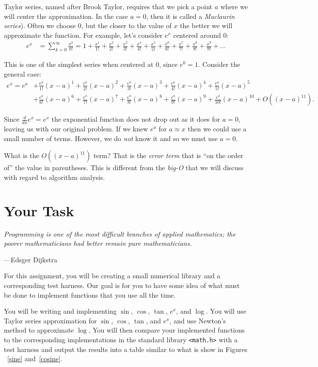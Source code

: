 \documentclass[11pt]{article}
\newcommand{\mlterm}[1]{\frac{x^{#1}}{#1!}}
\newcommand{\eterm}[1]{\frac{e^a}{#1!}{(x-a)}^{#1}}
\begin{document}
Taylor series, named after Brook Taylor, requires that we pick a point $a$ where
we will center the approximation. In the case $a =0$, then it is called a
\emph{Maclaurin series}).  Often we choose $0$, but the closer to the value of
$x$ the better we will approximate the function. For example, let's consider
$e^x$ centered around $0$:
\begin{align*}
  e^x & = \sum_{k=0}^{\infty} \frac{x^k}{k!} = 1 + \mlterm{1} + \mlterm{2} +
  \mlterm{3} + \mlterm{4} + \mlterm{5} + \mlterm{6} + \mlterm{7} + \mlterm{8} +
  \mlterm{9} + \ldots
\end{align*}

This is one of the simplest series when centered at $0$, since $e^0 = 1$.
Consider the general case:
\begin{align*}
  e^x = e^a &+ \eterm{1} + \eterm{2} + \eterm{3} + \eterm{4} + \eterm{5} \\
            &+ \eterm{6} + \eterm{7} + \eterm{8} + \eterm{9} + \eterm{10}
             + O({(x-a)}^{11}).
\end{align*}

Since $\frac{d}{dx}e^x=e^x$ the exponential function does not drop out as it
does for $a=0$, leaving us with our original problem. If we knew $e^a$ for $a
\approx x$ then we could use a small number of terms. However, we do \emph{not}
know it and so we must use $a=0$.

What is the $O\left((x-a)^{11}\right)$ term? That is the \emph{error term} that
is ``on the order of'' the value in parentheses. This is different from the
\emph{big-O} that we will discuss with regard to algorithm analysis.


\section{Your Task}

\epigraph{\emph{Programming is one of the most difficult branches of applied
mathematics; the poorer mathematicians had better remain pure
mathematicians.}}{---Edsger Dijkstra}

\noindent For this assignment, you will be creating a small numerical library
and a corresponding test harness. Our goal is for you to have some idea of what
must be done to implement functions that you use all the time.

You will be writing and implementing $\sin$, $\cos$, $\tan$, $e^x$, and $\log$.
You will use Taylor series approximation for $\sin$, $\cos$, $\tan$, and $e^x$,
and use Newton's method to approximate $\log$. You will then compare your
implemented functions to the corresponding implementations in the standard
library \texttt{<math.h>} with a test harness and output the results into a
table similar to what is show in Figures ~\ref{sine} and~\ref{cosine}.
\end{document}

